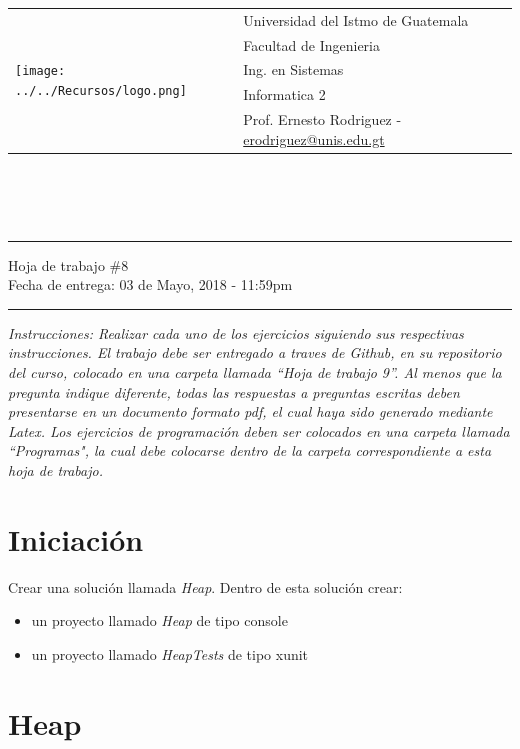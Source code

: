 \documentclass{article}
\newcommand{\horrule}[1]{\rule{\linewidth}{#1}}
\begin{document}
\begin{tabular}{l l}
\multirow{5}{*}{\texttt{[image: ../../Recursos/logo.png]}} & Universidad del Istmo de Guatemala \\
 & Facultad de Ingenieria \\
 & Ing. en Sistemas \\
 & Informatica 2 \\
 & Prof. Ernesto Rodriguez - \href{mailto:erodriguez@unis.edu.gt}{erodriguez@unis.edu.gt} \\
\end{tabular}
\\\\\\

\begin{center}
        \horrule{0.5pt}
        \huge{Hoja de trabajo \#8} \\
        \large{Fecha de entrega: 03 de Mayo, 2018 - 11:59pm} \\
        \horrule{1pt}
\end{center}
\emph{Instrucciones: Realizar cada uno de los ejercicios siguiendo sus respectivas
instrucciones. El trabajo debe ser entregado a traves de Github, en su repositorio del curso, colocado en una carpeta llamada ``Hoja de trabajo 9''.
Al menos que la pregunta indique diferente, todas las respuestas a preguntas escritas deben presentarse en
un documento formato pdf, el cual haya sido generado mediante Latex. Los ejercicios de programaci\'on deben ser colocados en una carpeta
llamada ``Programas", la cual debe colocarse dentro de la carpeta correspondiente a esta hoja de trabajo.}

\section*{Iniciaci\'on}

Crear una soluci\'on llamada \emph{Heap}. Dentro de esta soluci\'on crear:
\begin{itemize}
        \item{un proyecto llamado \emph{Heap} de tipo console}
        \item{un proyecto llamado \emph{HeapTests} de tipo xunit}
\end{itemize}

\section*{Heap}
\end{document}
